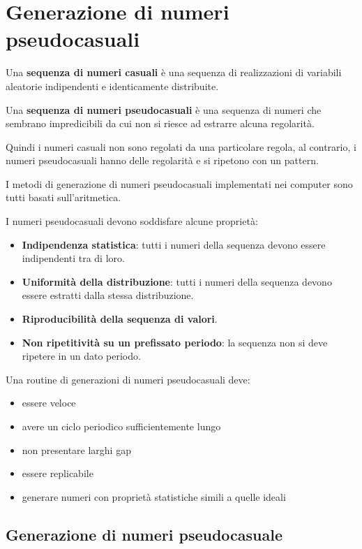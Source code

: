\section{Generazione di numeri pseudocasuali}
\begin{definizione} 
    Una \textbf{sequenza di numeri casuali} è una sequenza di realizzazioni di
    variabili aleatorie indipendenti e identicamente distribuite.
\end{definizione}
\begin{definizione} 
    Una \textbf{sequenza di numeri pseudocasuali} è una sequenza di numeri che
    sembrano impredicibili da cui non si riesce ad estrarre alcuna regolarità.
\end{definizione}
Quindi i numeri casuali non sono regolati da una particolare regola, al contrario,
i numeri pseudocasuali hanno delle regolarità e si ripetono con un pattern.
\begin{nota}
    I metodi di generazione di numeri pseudocasuali implementati nei computer
    sono tutti basati sull'aritmetica.
\end{nota}
I numeri pseudocasuali devono soddisfare alcune proprietà:
\begin{itemize}
    \item \textbf{Indipendenza statistica}: tutti i numeri della sequenza devono
          essere indipendenti tra di loro.
    \item \textbf{Uniformità della distribuzione}: tutti i numeri della sequenza
          devono essere estratti dalla stessa distribuzione.
    \item \textbf{Riproducibilità della sequenza di valori}.
    \item \textbf{Non ripetitività su un prefissato periodo}: la sequenza non si
          deve ripetere in un dato periodo.
\end{itemize}
Una routine di generazioni di numeri pseudocasuali deve:
\begin{itemize}
    \item essere veloce
    \item avere un ciclo periodico sufficientemente lungo
    \item non presentare larghi gap
    \item essere replicabile
    \item generare numeri con proprietà statistiche simili a quelle ideali
\end{itemize}
\subsection{Generazione di numeri pseudocasuale}
